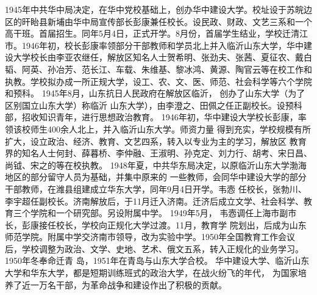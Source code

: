 \documentclass{sduthesis}
\begin{document}
1945年中共华中局决定，在华中党校基础上，创办华中建设大学。校址设于苏皖边区的旰眙县新埔由华中局宣传部长彭康兼任校长。设民政、财政、文艺三系和一个高干班。首届招生。同年5月4日，正式开学。8月份，首届学生结业，学校迁清江市。1946年初，校长彭康率领部分干部教师和学员北上并入临沂山东大学，华中建设大学校长由李亚农继任，解放区知名人士贺希明、张劲夫、张茜、夏征农、戴白韬、阿英、孙冶芳、范长江、车载、朱维基、黎冰鸿、黄源、陶官云等在校工作和执教。学校拟办成一所正规大学，设工、农、文、医、师范、社会科学等六个学院和预科。 1945年8月，山东抗日人民政府在解放区临沂， 创办了山东大学（为了区别国立山东大学）称临沂 山东大学），由李澄之、田佩之任正副校长。设预科部，招收知识青年，进行思想政治教育。 1946年初，华中建设大学校长彭康，率领该校师生400余人北上，并入临沂山东大学。师资力量 得到充实，学校规模有所扩大，设立政治、经济、教育、文艺四系，转入以专业为主的学习，解放区 教育界的知名人士何封、薛暮桥、李仲融、王淑明、孙克定、刘力行、胡考、宋日昌、尚钺、宋之的等在校执教。 1948年夏，中共华东局决定，以原临沂山东大学渤海地区的部分留守人员为基础，并集中原来的 一些教师，会同华中建设大学的部分干部教师，在潍县组建成立华东大学，同年9月4日开学。韦悫 任校长，张勃川、李宇超任副校长。济南解放后，于11月迁入济南。迁济后成立文学、社会科学、教 育三个学院和一个研究部。另设附属中学。 1949年5月， 韦悫调任上海市副市长，彭康接任校长，学校向正规化大学过渡。11月，教育学 院划出，后成为山东师范学院。附属中学交济南市领导，改为实验中学。1950年全国教育工作会议 后，学校调整为政治、文学、史地、艺术、俄文五系，转入正规化的业务学习。1950年冬奉命迁青 岛，1951年在青岛与山东大学合校。 华中建设大学、临沂山东大学和华东大学，都是短期训练班式的政治大学，在战火纷飞的年代， 为国家培养了近一万名干部，为革命战争和建设作出了积极的贡献。
\end{document}
